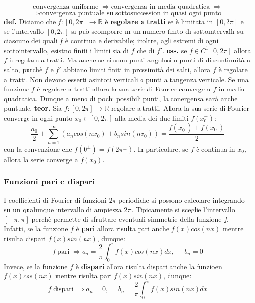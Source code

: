 \[
\text{convergenza uniforme}\; \Rightarrow \text{convergenza in media quadratica}\; \Rightarrow 
\]
\[
    \Rightarrow  \text{convergenza puntuale su sottosuccession in quasi ogni punto}\;
\]
\newline
\textbf{def.} Diciamo che $f : [0,2\pi] \rightarrow \mathbb{R}$ è \textbf{regolare a tratti} se è limitata in $[0,2\pi]$ e se l'intervallo $[0,2\pi]$ si può scomporre in un numero finito di sottointervalli su ciascuno dei quali $f$ è continua e derivabile; inoltre, agli estremi di ogni sottointervallo, esistno finiti i limiti sia di $f$ che di $f'$.\newline
\newline
\textbf{oss.} se $f \in C^1[0,2\pi]$ allora $f$ è regolare a tratti. Ma anche se ci sono punti angolosi o punti di discontinuità a salto, purchè $f$ e $f'$ abbiano limiti finiti in prossimità dei salti, allora $f$ è regolare a tratti. Non devono esserti asintoti verticali o punti a tangenza verticale.\newline
\newline
Se una funzione $f$ è regolare a tratti allora la sua serie di Fourier converge a $f$ in media quadratica. Dunque a meno di pochi possibili punti, la conergenza sarà anche puntuale.\newline
\newline
\textbf{teor.} Sia $f: [0,2\pi] \rightarrow \mathbb{R}$ regolare a tratti. Allora la sua serie di Fourier converge in ogni punto $x_0 \in [0,2\pi]$ alla media dei due limiti $f(x_0^{\pm})$:
\[
    \frac{a_0}{2} + \sum_{n=1}^{\infty} \left( a_n cos(nx_0) + b_n sin(nx_0) \right) = \frac{f(x_0^+) + f(x_0^-)}{2}
\]
con la convenzione che $f(0^\pm) = f(2\pi^\pm)$. In particolare, se $f$ è continua in $x_0$, allora la serie converge a $f(x_0)$.
\subsubsection{Funzioni pari e dispari}
I coefficienti di Fourier di funzioni $2\pi$-periodiche si possono calcolare integrando su un qualunque intervallo di ampiezza $2\pi$. Tipicamente si sceglie l'intervallo $[-\pi, \pi]$ perchè permette di sfruttare eventuali simmetrie della funzione $f$.\newline
Infatti, se la funzione $f$ è \textbf{pari} allora risulta pari anche $f(x)cos(nx)$ mentre risulta dispari $f(x)sin(nx)$, dunque:
\[
    f \; \text{pari}\; \Rightarrow a_n = \frac{2}{\pi} \int_{0}^{\pi}f(x) cos(nx) dx , \;\;\;\;\;b_n = 0
\]
Invece, se la funzione $f$ è \textbf{dispari} allora risulta dispari anche la funzioen $f(x)cos(nx)$ mentre risulta pari $f(x) sin(nx)$, dunque:
\[
    f \; \text{dispari}\; \Rightarrow a_n = 0, \;\;\;\;\;b_n = \frac{2}{\pi} \int_{0}^{\pi} f(x) sin(nx)dx
\]
